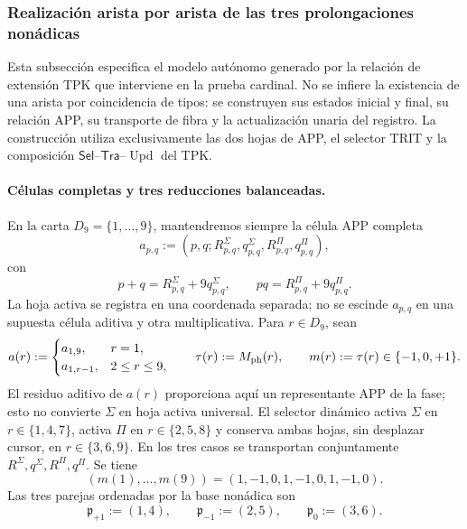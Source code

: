 \subsubsection{Realización arista por arista de las tres prolongaciones nonádicas}
\label{subsubsec:tres-vueltas-ext-ch}

Esta subsección especifica el modelo autónomo generado por la relación de
extensión TPK que interviene en la prueba cardinal. No se infiere la existencia de
una arista por coincidencia de tipos: se construyen sus estados inicial y final,
su relación APP, su transporte de fibra y la actualización unaria del registro.
La construcción utiliza exclusivamente las dos hojas de APP, el selector TRIT
y la composición \(\mathsf{Sel}\)--\(\mathsf{Tra}\)--\(\operatorname{Upd}\) del TPK.

\paragraph{Células completas y tres reducciones balanceadas.}
En la carta \(D_9=\{1,\ldots,9\}\), mantendremos siempre la célula APP
completa
\[
 a_{p,q}:=(p,q;R^\Sigma_{p,q},q^\Sigma_{p,q},
                 R^\Pi_{p,q},q^\Pi_{p,q}),
\]
con
\[
 p+q=R^\Sigma_{p,q}+9q^\Sigma_{p,q},\qquad
 pq=R^\Pi_{p,q}+9q^\Pi_{p,q}.
\]
La hoja activa se registra en una coordenada separada; no se escinde
\(a_{p,q}\) en una supuesta célula aditiva y otra multiplicativa. Para
\(r\in D_9\), sean
\begin{equation}
 a(r):=
 \begin{cases}
  a_{1,9},&r=1,\\
  a_{1,r-1},&2\le r\le9,
 \end{cases}
 \qquad
 \tau(r):=M_{\rm ph}(r),
 \qquad
 m(r):=\tau(r)\in\{-1,0,+1\}.
 \label{eq:celula-completa-fase-ch}
\end{equation}
El residuo aditivo de \(a(r)\) proporciona aquí un representante APP de la
fase; esto no convierte \(\Sigma\) en hoja activa universal. El selector
dinámico activa \(\Sigma\) en \(r\in\{1,4,7\}\), activa \(\Pi\) en
\(r\in\{2,5,8\}\) y conserva ambas hojas, sin desplazar cursor, en
\(r\in\{3,6,9\}\). En los tres casos se transportan conjuntamente
\(R^\Sigma,q^\Sigma,R^\Pi,q^\Pi\). Se tiene
\[
 (m(1),\ldots,m(9))=(1,-1,0,1,-1,0,1,-1,0).
\]
Las tres parejas ordenadas por la base nonádica son
\begin{equation}
 \mathfrak p_{+1}:=(1,4),\qquad
 \mathfrak p_{-1}:=(2,5),\qquad
 \mathfrak p_{0}:=(3,6).
 \label{eq:tres-pares-internos-ch}
\end{equation}
